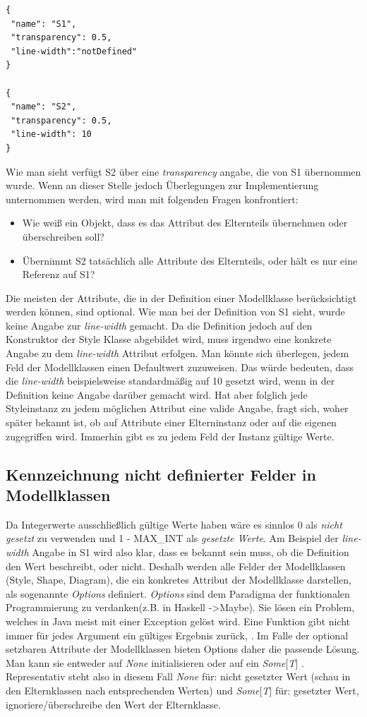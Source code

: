 \begin{lstlisting}[style=spray]
{
 "name": "S1",
 "transparency": 0.5,
 "line-width":"notDefined"
}

{
 "name": "S2",
 "transparency": 0.5,
 "line-width": 10
}
\end{lstlisting}Wie man sieht verfügt S2 über eine \textit{transparency} angabe, die von S1 übernommen wurde. Wenn an dieser Stelle jedoch Überlegungen zur Implementierung unternommen werden, wird man mit folgenden Fragen konfrontiert:
\begin{itemize}
\item Wie weiß ein Objekt, dass es das Attribut des Elternteils übernehmen oder überschreiben soll?
\item Übernimmt S2 tatsächlich alle Attribute des Elternteils, oder hält es nur eine Referenz auf S1?
\end{itemize}Die meisten der Attribute, die in der Definition einer Modellklasse berücksichtigt werden können, sind optional. Wie man bei der Definition von S1 sieht, wurde keine Angabe zur \textit{line-width} gemacht. Da die Definition jedoch auf den Konstruktor der Style Klasse abgebildet wird, muss irgendwo eine konkrete Angabe zu dem \textit{line-width} Attribut erfolgen. Man könnte sich überlegen, jedem Feld der Modellklassen einen Defaultwert zuzuweisen. Das würde bedeuten, dass die \textit{line-width} beispielsweise standardmäßig auf 10 gesetzt wird, wenn in der Definition keine Angabe darüber gemacht wird. Hat aber folglich jede Styleinstanz zu jedem möglichen Attribut eine valide Angabe, fragt sich, woher später bekannt ist, ob auf Attribute einer Elterninstanz oder auf die eigenen zugegriffen wird. Immerhin gibt es zu jedem Feld der Instanz gültige Werte.
\subsection{Kennzeichnung nicht definierter Felder in Modellklassen}
Da Integerwerte ausschließlich gültige Werte haben wäre es sinnlos 0 als \textit{nicht gesetzt} zu verwenden und 1 - MAX\_INT als \textit{gesetzte Werte}. Am Beispiel der \textit{line-width} Angabe in S1 wird also klar, dass es bekannt sein muss, ob die Definition den Wert beschreibt, oder nicht. 
Deshalb werden alle Felder der Modellklassen (Style, Shape, Diagram), die ein konkretes Attribut der Modellklasse darstellen, als sogenannte \textit{Options} definiert. \textit{Options} sind dem Paradigma der funktionalen Programmierung zu verdanken(z.B. in Haskell -\textgreater Maybe).
Sie lösen ein Problem, welches in Java meist mit einer Exception gelöst wird.
Eine Funktion gibt nicht immer für jedes Argument ein gültiges Ergebnis zurück, \citet[p. 102]{esser:scala}. Im Falle der optional setzbaren Attribute der Modellklassen bieten Options daher die passende Lösung. Man kann sie entweder auf \textit{None} initialisieren oder auf ein \textit{Some$[$T$]$ }. Representativ steht also in diesem Fall \textit{None} für: nicht gesetzter Wert (schau in den Elternklassen nach entsprechenden Werten) und \textit{Some$[$T$]$} für: gesetzter Wert, ignoriere/überschreibe den Wert der Elternklasse.
